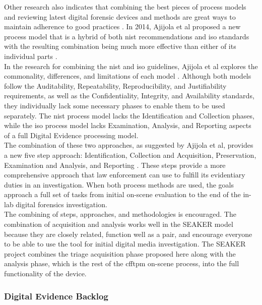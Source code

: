 \documentclass[12pt]{article}
\begin{document}
Other research also indicates that combining the best pieces of process models and reviewing
latest digital forensic devices and methods are great ways to maintain adherence to 
good practices \cite{ajijola2014review}.  In 2014, Ajijola et al proposed a new process model
that is a hybrid of both \gls{nist} recommendations and \gls{iso} standards
with the resulting combination being much more effective than either of its individual
parts \cite{ajijola2014review}.\\

In the research for combining the \gls{nist} and \gls{iso} guidelines, Ajijola et al
explores the commonality, differences, and limitations of each model \cite{ajijola2014review}.  Although both models
follow the Auditability, Repeatability, Reproducibility, and Justifiability requirements, as
well as the Confidentiality, Integrity, and Availability standards, they individually lack some
necessary phases to enable them to be used separately.  The \gls{nist} process model lacks the
Identification and Collection phases, while the \gls{iso} process model lacks Examination, Analysis,
and Reporting aspects of a full Digital Evidence processing model.\\

The combination of these two approaches, as suggested by Ajijola et al,
provides a new five step approach: Identification, Collection and Acquisition, Preservation,
Examination and Analysis, and Reporting \cite{ajijola2014review}. These steps provide a more comprehensive approach that
law enforcement can use to fulfill its evidentiary duties in an investigation.  When both
process methods are used, the goals approach a full set of tasks from initial on-scene
evaluation to the end of the in-lab digital forensics investigation.\\

The combining of steps, approaches, and methodologies is encouraged.  The combination of 
acquisition and analysis works well in the SEAKER model because they are closely related,
function well as a pair, and encourage everyone to be able to use the tool for initial digital
media investigation.  The SEAKER
project combines the triage acquisition phase proposed here along with the analysis
phase, which is the rest of the \gls{cfftpm} on-scene process, into the full functionality
of the device.\\

\subsubsection{Digital Evidence Backlog}
\end{document}

